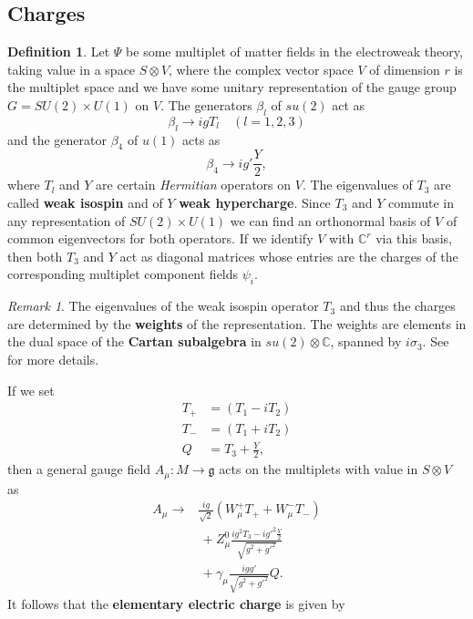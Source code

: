 \documentclass[12pt]{amsart}
\theoremstyle{definition}
\newtheorem{defn}[thm]{Definition}
\theoremstyle{remark}
\newtheorem{rem}[thm]{Remark}
\numberwithin{equation}{section}
\begin{document}
\subsection{Charges}
\begin{defn}Let $\Psi$ be some multiplet of matter fields in the electroweak theory, taking value in a space $S\otimes V$, where the complex vector space $V$ of dimension $r$ is the multiplet space and we have some unitary representation of the gauge group $G=SU(2)\times U(1)$ on $V$. The generators $\beta_l$ of $su(2)$ act as 
\begin{equation*}
\beta_l\rightarrow igT_l\quad(l=1,2,3)
\end{equation*}
and the generator $\beta_4$ of $u(1)$ acts as 
\begin{equation*}
\beta_4\rightarrow ig'\frac{Y}{2},
\end{equation*}
where $T_l$ and $Y$ are certain {\em Hermitian} operators on $V$. The eigenvalues of $T_3$ are called {\bf weak isospin} and of $Y$ {\bf weak hypercharge}. Since $T_3$ and $Y$ commute in any representation of $SU(2)\times U(1)$ we can find an orthonormal basis of $V$ of common eigenvectors for both operators. If we identify $V$ with $\mathbb{C}^r$ via this basis, then both $T_3$ and $Y$ act as diagonal matrices whose entries are the charges of the corresponding multiplet component fields $\psi_i$.
\end{defn}
\begin{rem}The eigenvalues of the weak isospin operator $T_3$ and thus the charges are determined by the {\bf weights} of the representation. The weights are elements in the dual space of the {\bf Cartan subalgebra} in $su(2)\otimes\mathbb{C}$, spanned by $i\sigma_3$. See \cite{Ziller} for more details.
\end{rem}
If we set
\begin{align*}
T_+&=(T_1-iT_2)\\
T_-&=(T_1+iT_2)\\
Q&=T_3+\frac{Y}{2},
\end{align*}
then a general gauge field $A_\mu\colon M\rightarrow \mathfrak{g}$ acts on the multiplets with value in $S\otimes V$ as 
\begin{align*}
A_\mu\rightarrow&\frac{ig}{\sqrt{2}}(W^+_\mu T_++W^-_\mu T_-)\\
&\,+Z^0_\mu\frac{ig^2T_3-ig'^2\frac{Y}{2}}{\sqrt{g^2+g'^2}}\\
&\,+\gamma_\mu\frac{igg'}{\sqrt{g^2+g'^2}}Q.
\end{align*} 
It follows that the {\bf elementary electric charge} is given by 
\end{document}
